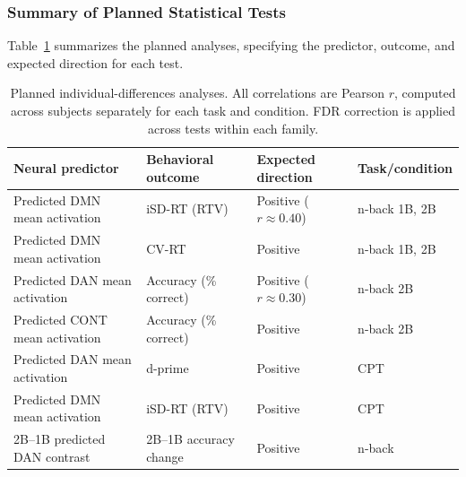 \subsubsection{Summary of Planned Statistical Tests}

Table~\ref{tab:tests} summarizes the planned analyses, specifying the predictor, outcome, and expected direction for each test.

\begin{table}[ht]
\centering
\small
\caption{Planned individual-differences analyses. All correlations are Pearson $r$, computed across subjects separately for each task and condition. FDR correction is applied across tests within each family.}
\label{tab:tests}
\begin{tabular}{p{3.5cm} p{3.5cm} p{2.5cm} p{2.5cm}}
\hline
\textbf{Neural predictor} & \textbf{Behavioral outcome} & \textbf{Expected direction} & \textbf{Task/condition} \\
\hline
Predicted DMN mean activation & iSD-RT (RTV) & Positive ($r \approx 0.40$) & n-back 1B, 2B \\
Predicted DMN mean activation & CV-RT & Positive & n-back 1B, 2B \\
Predicted DAN mean activation & Accuracy (\% correct) & Positive ($r \approx 0.30$) & n-back 2B \\
Predicted CONT mean activation & Accuracy (\% correct) & Positive & n-back 2B \\
Predicted DAN mean activation & d-prime & Positive & CPT \\
Predicted DMN mean activation & iSD-RT (RTV) & Positive & CPT \\
2B--1B predicted DAN contrast & 2B--1B accuracy change & Positive & n-back \\
\hline
\end{tabular}
\end{table}
